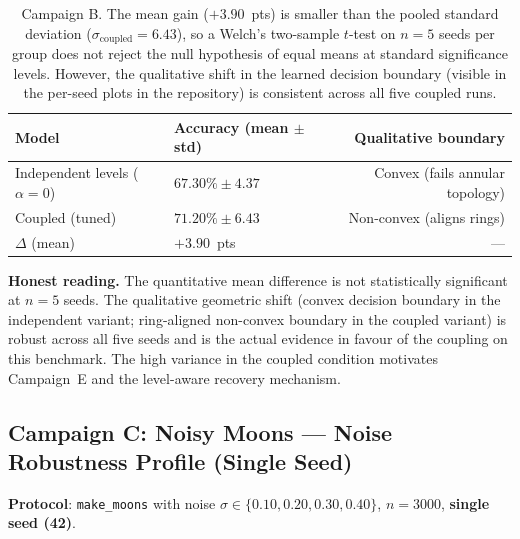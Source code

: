 \documentclass[11pt,a4paper]{article}
\begin{document}
\begin{table}[h]
\centering
\small
\begin{tabular}{llr}
\toprule
\textbf{Model} & \textbf{Accuracy (mean $\pm$ std)} & \textbf{Qualitative boundary} \\
\midrule
Independent levels ($\alpha=0$) & $67.30\% \pm 4.37$ & Convex (fails annular topology) \\
Coupled (tuned)                 & $71.20\% \pm 6.43$ & Non-convex (aligns rings) \\
\midrule
$\Delta$ (mean)                 & $+3.90$~pts        & --- \\
\bottomrule
\end{tabular}
\caption{Campaign B. The mean gain ($+3.90$~pts) is smaller than the pooled standard
deviation ($\sigma_{\mathrm{coupled}}=6.43$), so a Welch's two-sample $t$-test on $n=5$
seeds per group does not reject the null hypothesis of equal means at standard
significance levels. However, the qualitative shift in the learned decision boundary
(visible in the per-seed plots in the repository) is consistent across all five coupled
runs.}
\label{tab:campaign_b}
\end{table}

\textbf{Honest reading.} The quantitative mean difference is not statistically significant
at $n=5$ seeds. The qualitative geometric shift (convex decision boundary in the
independent variant; ring-aligned non-convex boundary in the coupled variant) is robust
across all five seeds and is the actual evidence in favour of the coupling on this
benchmark. The high variance in the coupled condition motivates Campaign~E and the
level-aware recovery mechanism.

\subsection{Campaign C: Noisy Moons --- Noise Robustness Profile (Single Seed)}

\textbf{Protocol}: \texttt{make\_moons} with noise $\sigma \in \{0.10, 0.20, 0.30, 0.40\}$,
$n=3000$, \textbf{single seed (42)}.
\end{document}
